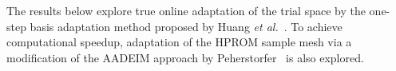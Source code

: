 The results below explore true online adaptation of the trial space by the one-step basis adaptation method proposed by Huang \textit{et al.}~\cite{Huang2022a}. To achieve computational speedup, adaptation of the HPROM sample mesh via a modification of the AADEIM approach by Peherstorfer~\cite{Peherstorfer2020Adaptive} is also explored.